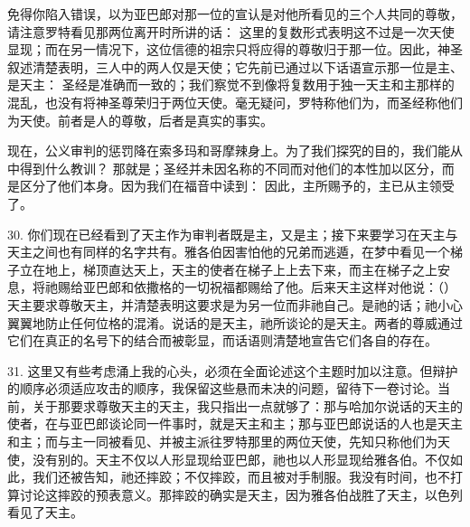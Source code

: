 免得你陷入错误，以为亚巴郎对那一位的宣认是对他所看见的三个人共同的尊敬，请注意罗特看见那两位离开时所讲的话： 这里的复数形式表明这不过是一次天使显现；而在另一情况下，这位信德的祖宗只将应得的尊敬归于那一位。因此，神圣叙述清楚表明，三人中的两人仅是天使；它先前已通过以下话语宣示那一位是主、是天主： 圣经是准确而一致的；我们察觉不到像将复数用于独一天主和主那样的混乱，也没有将神圣尊荣归于两位天使。毫无疑问，罗特称他们为，而圣经称他们为天使。前者是人的尊敬，后者是真实的事实。\par

现在，公义审判的惩罚降在索多玛和哥摩辣身上。为了我们探究的目的，我们能从中得到什么教训？ 那就是；圣经并未因名称的不同而对他们的本性加以区分，而是区分了他们本身。因为我们在福音中读到： 因此，主所赐予的，主已从主领受了。\par

30. 你们现在已经看到了天主作为审判者既是主，又是主；接下来要学习在天主与天主之间也有同样的名字共有。雅各伯因害怕他的兄弟而逃遁，在梦中看见一个梯子立在地上，梯顶直达天上，天主的使者在梯子上上去下来，而主在梯子之上安息，将祂赐给亚巴郎和依撒格的一切祝福都赐给了他。后来天主这样对他说：（）天主要求尊敬天主，并清楚表明这要求是为另一位而非祂自己。是祂的话；祂小心翼翼地防止任何位格的混淆。说话的是天主，祂所谈论的是天主。两者的尊威通过它们在真正的名号下的结合而被彰显，而话语则清楚地宣告它们各自的存在。\par

31. 这里又有些考虑涌上我的心头，必须在全面论述这个主题时加以注意。但辩护的顺序必须适应攻击的顺序，我保留这些悬而未决的问题，留待下一卷讨论。当前，关于那要求尊敬天主的天主，我只指出一点就够了：那与哈加尔说话的天主的使者，在与亚巴郎谈论同一件事时，就是天主和主；那与亚巴郎说话的人也是天主和主；而与主一同被看见、并被主派往罗特那里的两位天使，先知只称他们为天使，没有别的。天主不仅以人形显现给亚巴郎，祂也以人形显现给雅各伯。不仅如此，我们还被告知，祂还摔跤；不仅摔跤，而且被对手制服。我没有时间，也不打算讨论这摔跤的预表意义。那摔跤的确实是天主，因为雅各伯战胜了天主，以色列看见了天主。\par

